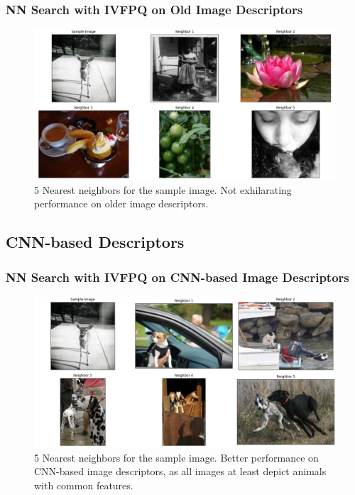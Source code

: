 \begin{frame}
\frametitle{NN Search with IVFPQ on Old Image Descriptors}

\begin{figure}
\centering
\includegraphics[width=0.85\linewidth]{../images/ivfpq/visual_assessment_old}
\caption{5 Nearest neighbors for the sample image. Not exhilarating performance on older image descriptors.}
\end{figure}

\end{frame}


\subsection{CNN-based Descriptors}

\begin{frame}
\frametitle{NN Search with IVFPQ on CNN-based Image Descriptors}

\begin{figure}
\centering
\includegraphics[width=0.85\linewidth,height=0.5\textheight]{../images/ivfpq/visual_assessment}
\caption{5 Nearest neighbors for the sample image. Better performance on CNN-based image descriptors, as all images at least depict animals with common features.}
\end{figure}

\end{frame}


